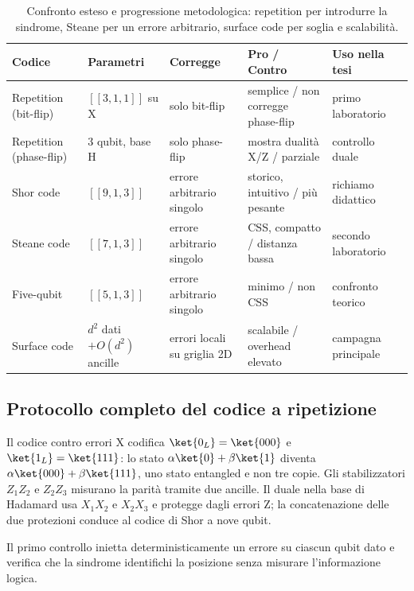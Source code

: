 \begin{onehalfspace}
\begin{table}[H]
\centering
\scriptsize
\begin{tabularx}{\textwidth}{@{}p{2.0cm}p{1.6cm}XXX@{}}
\toprule
\textbf{Codice} & \textbf{Parametri} & \textbf{Corregge} & \textbf{Pro / Contro} & \textbf{Uso nella tesi} \\
\midrule
Repetition (bit-flip) & $[[3,1,1]]$ su X & solo bit-flip & semplice / non corregge phase-flip & primo laboratorio \\
Repetition (phase-flip) & 3 qubit, base H & solo phase-flip & mostra dualità X/Z / parziale & controllo duale \\
Shor code & $[[9,1,3]]$ & errore arbitrario singolo & storico, intuitivo / più pesante & richiamo didattico~\cite{shorcorrection1995} \\
Steane code & $[[7,1,3]]$ & errore arbitrario singolo & \ac{CSS}, compatto / distanza bassa & secondo laboratorio~\cite{steane1996} \\
Five-qubit & $[[5,1,3]]$ & errore arbitrario singolo & minimo / non \ac{CSS} & confronto teorico \\
Surface code & $d^2$ dati $+O(d^2)$ ancille & errori locali su griglia 2D & scalabile / overhead elevato & campagna principale~\cite{fowler2012} \\
\bottomrule
\end{tabularx}
\caption[Confronto tra codici correttori quantistici]{Confronto esteso e
progressione metodologica: repetition per introdurre la sindrome, Steane
per un errore arbitrario, surface code per soglia e scalabilità.}
\label{tab:confronto_codici}
\end{table}

\subsection{Protocollo completo del codice a ripetizione}
\label{app:qec_repetition}

Il codice contro errori X codifica $\ket{0_L}=\ket{000}$ e
$\ket{1_L}=\ket{111}$: lo stato
$\alpha\ket{0}+\beta\ket{1}$ diventa
$\alpha\ket{000}+\beta\ket{111}$, uno stato entangled e non tre copie.
Gli stabilizzatori $Z_1Z_2$ e $Z_2Z_3$ misurano la parità tramite due
ancille. Il duale nella base di Hadamard usa $X_1X_2$ e $X_2X_3$ e
protegge dagli errori Z; la concatenazione delle due protezioni conduce
al codice di Shor a nove qubit.

Il primo controllo inietta deterministicamente un errore su ciascun qubit
dato e verifica che la sindrome identifichi la posizione senza misurare
l'informazione logica.


\end{onehalfspace}
